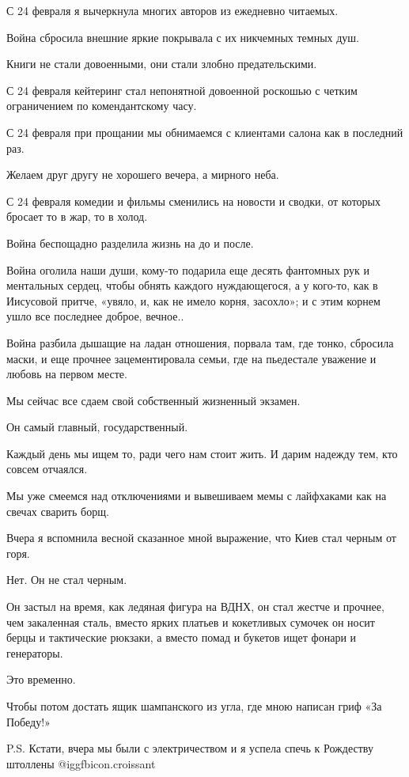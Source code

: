 С 24 февраля я вычеркнула многих авторов из ежедневно читаемых. 

Война сбросила внешние яркие покрывала с их никчемных темных душ. 

Книги не стали довоенными, они стали злобно предательскими.

С 24 февраля кейтеринг стал непонятной довоенной роскошью с четким ограничением
по комендантскому часу. 

С 24 февраля при прощании мы обнимаемся с клиентами салона как в последний раз. 

Желаем друг другу не хорошего вечера, а мирного неба.

С 24 февраля комедии и фильмы сменились на новости и сводки, от которых бросает
то в жар, то в холод.

Война беспощадно разделила жизнь на до и после.

Война оголила наши души, кому-то подарила еще десять фантомных рук и ментальных
сердец, чтобы обнять каждого нуждающегося, а у кого-то, как в Иисусовой притче,
«увяло, и, как не имело корня, засохло»; и с этим корнем ушло все последнее
доброе, вечное..

Война разбила дышащие на ладан отношения, порвала там, где тонко, сбросила
маски, и еще прочнее зацементировала семьи, где на пьедестале уважение и любовь
на первом месте.

Мы сейчас все сдаем свой собственный жизненный экзамен. 

Он самый главный, государственный. 

Каждый день мы ищем то, ради чего нам стоит жить. И дарим надежду тем, кто
совсем отчаялся.

Мы уже смеемся над отключениями и вывешиваем мемы с лайфхаками как на свечах
сварить борщ.

Вчера я вспомнила весной сказанное мной выражение, что Киев стал черным от
горя. 

Нет. Он не стал черным. 

Он застыл на время, как ледяная фигура на ВДНХ, он стал жестче и прочнее, чем
закаленная сталь, вместо ярких платьев и кокетливых сумочек он носит берцы и
тактические рюкзаки, а вместо помад и букетов ищет фонари и генераторы.

Это временно.

Чтобы потом достать ящик шампанского из угла, где мною написан гриф «За
Победу!»

P.S. Кстати, вчера мы были с электричеством и я успела спечь к Рождеству
штоллены @igg{fbicon.croissant}

